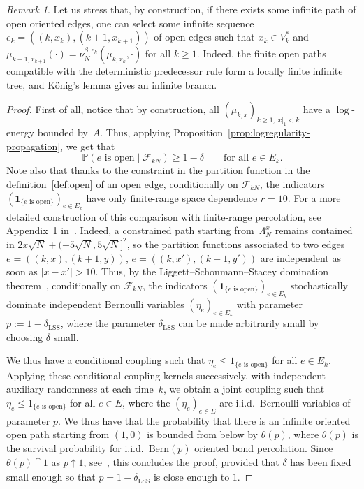 \documentclass[11pt]{amsart}
\numberwithin{equation}{section}
\newcommand*{\ind}{\mathbf{1}}
\theoremstyle{plain}
\theoremstyle{definition}
\theoremstyle{remark}
\newtheorem{remark}[theorem]{Remark}
\begin{document}
\begin{remark}
       \label{rem:infinite-path}
       Let us stress that, by construction, if there exists some infinite path of open oriented edges, one can select some infinite sequence \(e_k = ((k,x_k),(k+1,x_{k+1}))\) of open edges such that \(x_k \in V_k^*\) and \(\mu_{k+1,x_{k+1}}(\cdot) = \nu_N^{\beta,e_k}(\mu_{k,x_k},\cdot)\) for all \(k\geq 1\).
       Indeed, the finite open paths compatible with the deterministic predecessor rule form a locally finite infinite tree, and K\"onig's lemma gives an infinite branch.
\end{remark}


\begin{proof}
       First of all, notice that by construction, all \((\mu_{k,x})_{k\geq 1, |x|_1<k}\) have a \(\log\)-energy bounded by~\(A\).       Thus, applying Proposition~\ref{prop:logregularity-propagation}, we get that
       \[
       \mathbb P\left(e\text{ is open} \mid \mathcal F_{kN}\right) \ge 1-\delta
       \qquad\text{for all } e\in E_k.
       \]
       Note also that thanks to the constraint in the partition function in the definition~\eqref{def:open} of an open edge, conditionally on \(\mathcal F_{kN}\), the indicators \((\ind_{\{e \text{ is open}\}})_{e\in E_k}\) have only finite-range space dependence \(r=10\).
       For a more detailed construction of this comparison with finite-range percolation, see Appendix~1 in~\cite{KKN20}.
       Indeed, a constrained path starting from~\(\Lambda_N^x\) remains contained in \(2x\sqrt N+(-5\sqrt N,5\sqrt N]^2\), so the partition functions associated to two edges \(e=((k,x),(k+1,y))\), \(e=((k,x'),(k+1,y'))\) are independent as soon as \(|x-x'| >10\).
       Thus, by the Liggett--Schonmann--Stacey domination theorem~\cite{LSS97}, conditionally on \(\mathcal{F}_{kN}\), the indicators \((\ind_{\{e \text{ is open}\}})_{e\in E_k}\) stochastically dominate independent Bernoulli variables \((\eta_e)_{e\in E_k}\) with parameter \(p:=1-\delta_{\mathrm{LSS}}\), where the parameter \(\delta_{\mathrm{LSS}}\) can be made arbitrarily small by choosing \(\delta\) small.

       We thus have a conditional coupling such that \(\eta_e\le 1_{\{e\text{ is open}\}}\) for all \(e\in E_k\).
       Applying these conditional coupling kernels successively, with independent auxiliary randomness at each time~\(k\), we obtain a joint coupling such that \(\eta_e\le 1_{\{e\text{ is open}\}}\) for all \(e\in E\), where the \((\eta_e)_{e\in E}\) are i.i.d.\ Bernoulli variables of parameter \(p\).
       We thus have that the probability that there is an infinite oriented open path starting from \((1,0)\) is bounded from below by \(\theta(p)\), where \(\theta(p)\) is the survival probability for i.i.d.\ \(\mathrm{Bern}(p)\) oriented bond percolation.
       Since \(\theta(p) \uparrow 1\) as \(p\uparrow 1\), see~\cite{Durrett84}, this concludes the proof, provided that \(\delta\) has been fixed small enough so that \(p=1-\delta_{\mathrm{LSS}}\) is close enough to \(1\).
\end{proof}
\end{document}
